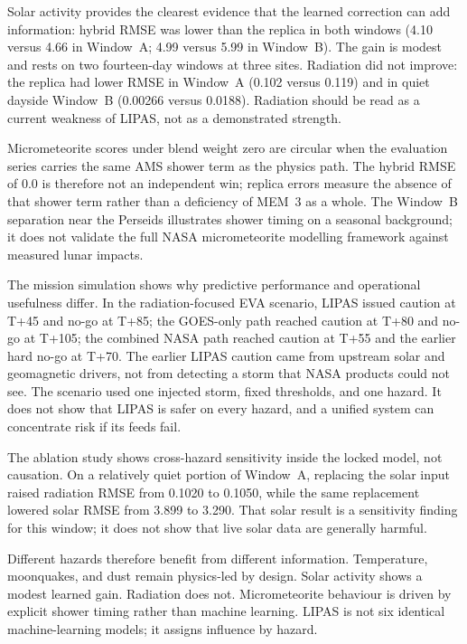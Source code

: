 Solar activity provides the clearest evidence that the learned correction can add information: hybrid RMSE was lower than the replica in both windows (4.10 versus 4.66 in Window~A; 4.99 versus 5.99 in Window~B). The gain is modest and rests on two fourteen-day windows at three sites. Radiation did not improve: the replica had lower RMSE in Window~A (0.102 versus 0.119) and in quiet dayside Window~B (0.00266 versus 0.0188). Radiation should be read as a current weakness of LIPAS, not as a demonstrated strength.

Micrometeorite scores under blend weight zero are circular when the evaluation series carries the same AMS shower term as the physics path. The hybrid RMSE of 0.0 is therefore not an independent win; replica errors measure the absence of that shower term rather than a deficiency of MEM~3 as a whole. The Window~B separation near the Perseids illustrates shower timing on a seasonal background; it does not validate the full NASA micrometeorite modelling framework against measured lunar impacts.

The mission simulation shows why predictive performance and operational usefulness differ. In the radiation-focused EVA scenario, LIPAS issued caution at T+45 and no-go at T+85; the GOES-only path reached caution at T+80 and no-go at T+105; the combined NASA path reached caution at T+55 and the earlier hard no-go at T+70. The earlier LIPAS caution came from upstream solar and geomagnetic drivers, not from detecting a storm that NASA products could not see. The scenario used one injected storm, fixed thresholds, and one hazard. It does not show that LIPAS is safer on every hazard, and a unified system can concentrate risk if its feeds fail.

The ablation study shows cross-hazard sensitivity inside the locked model, not causation. On a relatively quiet portion of Window~A, replacing the solar input raised radiation RMSE from 0.1020 to 0.1050, while the same replacement lowered solar RMSE from 3.899 to 3.290. That solar result is a sensitivity finding for this window; it does not show that live solar data are generally harmful.

Different hazards therefore benefit from different information. Temperature, moonquakes, and dust remain physics-led by design. Solar activity shows a modest learned gain. Radiation does not. Micrometeorite behaviour is driven by explicit shower timing rather than machine learning. LIPAS is not six identical machine-learning models; it assigns influence by hazard.

